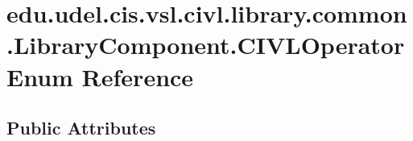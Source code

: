 \hypertarget{enumedu_1_1udel_1_1cis_1_1vsl_1_1civl_1_1library_1_1common_1_1LibraryComponent_1_1CIVLOperator}{}\section{edu.\+udel.\+cis.\+vsl.\+civl.\+library.\+common.\+Library\+Component.\+C\+I\+V\+L\+Operator Enum Reference}
\label{enumedu_1_1udel_1_1cis_1_1vsl_1_1civl_1_1library_1_1common_1_1LibraryComponent_1_1CIVLOperator}
\subsection*{Public Attributes}

